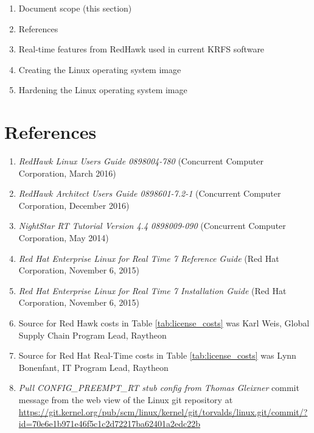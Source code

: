 \documentclass[12pt]{article}
\begin{document}
\begin{enumerate}
    \item Document scope (this section)
    \item References
    \item Real-time features from RedHawk used in current KRFS software
    \item Creating the Linux operating system image
    \item Hardening the Linux operating system image
\end{enumerate}



%
\newpage
\section{References}

\begin{enumerate}
    \item \textit{RedHawk Linux Users Guide 0898004-780} (Concurrent Computer Corporation, March 2016) \label{ref:red_hawk_guide}
    \item \textit{RedHawk Architect Users Guide 0898601-7.2-1} (Concurrent Computer Corporation, December 2016) \label{ref:architect}
    \item \textit{NightStar RT Tutorial Version 4.4 0898009-090} (Concurrent Computer Corporation, May 2014) \label{ref:nightstar}
    \item \textit{Red Hat Enterprise Linux for Real Time 7 Reference Guide} (Red Hat Corporation, November 6, 2015) \label{ref:rhel7_ref}
    \item \textit{Red Hat Enterprise Linux for Real Time 7 Installation Guide} (Red Hat Corporation, November 6, 2015) \label{ref:rhel7_install}
    \item Source for Red Hawk costs in Table \ref{tab:license_costs} was Karl Weis, Global Supply Chain Program Lead, Raytheon \label{ref:karl}
    \item Source for Red Hat Real-Time costs in Table \ref{tab:license_costs} was Lynn Bonenfant, IT Program Lead, Raytheon \label{ref:lynn}
    \item \textit{Pull CONFIG\_PREEMPT\_RT stub config from Thomas Gleixner} commit message from the web view of the Linux git repository at \url{https://git.kernel.org/pub/scm/linux/kernel/git/torvalds/linux.git/commit/?id=70e6e1b971e46f5c1c2d72217ba62401a2edc22b} \label{ref:commit}
\end{enumerate}
\end{document}

